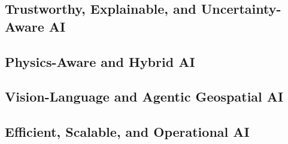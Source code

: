 \documentclass[11pt,a4paper]{article}
\begin{document}

\subsection{Trustworthy, Explainable, and Uncertainty-Aware AI}


\subsection{Physics-Aware and Hybrid AI}


\subsection{Vision-Language and Agentic Geospatial AI}


\subsection{Efficient, Scalable, and Operational AI}

\end{document}
